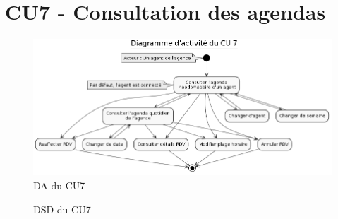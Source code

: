 \clearpage
\section{CU7 - Consultation des agendas}
\begin{figure}[H]
\centering
\includegraphics[width=20cm, angle=90]{figures/DA_CU7.png}
\caption{DA du CU7}
\end{figure}


\begin{figure}[H]
\noindent{}
\caption{DSD du CU7}
\end{figure}

